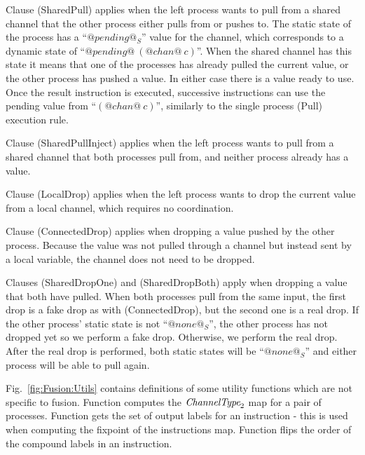 Clause (SharedPull) applies when the left process wants to pull from a shared channel that the other process either pulls from or pushes to.
The static state of the process has a ``$@pending@_S$'' value for the channel, which corresponds to a dynamic state of ``$@pending@~(@chan@~c)$''.
When the shared channel has this state it means that one of the processes has already pulled the current value, or the other process has pushed a value. In either case there is a value ready to use. Once the result instruction is executed, successive instructions can use the pending value from ``$(@chan@~c)$'', similarly to the single process (Pull) execution rule.

Clause (SharedPullInject) applies when the left process wants to pull from a shared channel that both processes pull from, and neither process already has a value.


Clause (LocalDrop) applies when the left process wants to drop the current value from a local channel, which requires no coordination. 

Clause (ConnectedDrop) applies when dropping a value pushed by the other process.
Because the value was not pulled through a channel but instead sent by a local variable, the channel does not need to be dropped.


Clauses (SharedDropOne) and (SharedDropBoth) apply when dropping a value that both have pulled.
When both processes pull from the same input, the first drop is a fake drop as with (ConnectedDrop), but the second one is a real drop.
If the other process' static state is not ``$@none@_S$'', the other process has not dropped yet so we perform a fake drop.
Otherwise, we perform the real drop.
After the real drop is performed, both static states will be ``$@none@_S$'' and either process will be able to pull again.




\smallskip
Fig.~\ref{fig:Fusion:Utils} contains definitions of some utility functions which are not specific to fusion.
Function  computes the $\textit{ChannelType}_2$ map for a pair of processes.
Function  gets the set of output labels for an instruction - this is used when computing the fixpoint of the instructions map.
Function  flips the order of the compound labels in an instruction.
